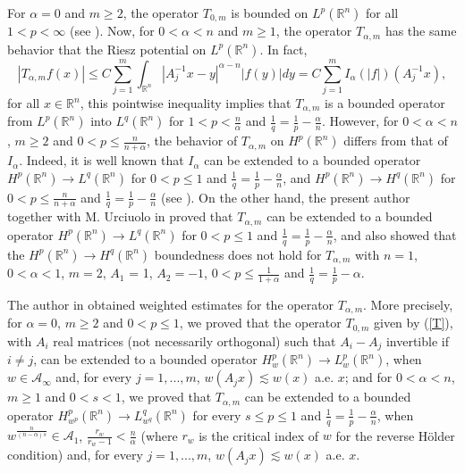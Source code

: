 \documentclass[oneside,10pt]{article}
\begin{document}
For $\alpha = 0$ and $m \geq 2$, the operator $T_{0,m}$ is bounded on $L^p(\mathbb{R}^n)$ for all $1 < p < \infty$ 
(see \cite[Theorem 6]{Ro-Ur2017}). Now, for $0 < \alpha < n$ and $m \geq 1$, the operator $T_{\alpha, m}$ has the same behavior that the 
Riesz potential on $L^{p}(\mathbb{R}^{n})$. In fact,
\[
|T_{\alpha, m}f(x) | \leq C \sum_{j=1}^{m} \int_{\mathbb{R}^{n}} |A_{j}^{-1}x - y |^{\alpha - n} |f(y)| dy = C \sum_{j=1}^{m} I_{\alpha}(|f|)(A_{j}^{-1}x),
\]
for all $x \in \mathbb{R}^{n}$, this pointwise inequality implies that $T_{\alpha, m}$ is a bounded operator from 
$L^{p}(\mathbb{R}^{n})$ into $L^{q}(\mathbb{R}^{n})$ for $1 < p < \frac{n}{\alpha}$ and $\frac{1}{q} = \frac{1}{p} - \frac{\alpha}{n}$. However, for $0 < \alpha < n$, $m \geq 2$ and $0 < p \leq \frac{n}{n + \alpha}$, the behavior of $T_{\alpha, m}$ on $H^p(\mathbb{R}^n)$ 
differs from that of $I_{\alpha}$. Indeed, it is well known that $I_{\alpha}$ can be extended to 
a bounded operator $H^p(\mathbb{R}^n) \to L^{q}(\mathbb{R}^{n})$ for $0 < p \leq 1$ and $\frac{1}{q} = \frac{1}{p} - \frac{\alpha}{n}$, 
and $H^p(\mathbb{R}^n) \to H^{q}(\mathbb{R}^{n})$ for $0 < p \leq \frac{n}{n+\alpha}$ and $\frac{1}{q} = \frac{1}{p} - \frac{\alpha}{n}$ 
(see \cite{Taible}). On the other hand, the present author together with M. Urciuolo in \cite{Ro-Ur2012} proved that $T_{\alpha, m}$ can be extended to a bounded operator $H^p(\mathbb{R}^n) \to L^{q}(\mathbb{R}^{n})$ for $0 < p \leq 1$ and $\frac{1}{q} = \frac{1}{p} - \frac{\alpha}{n}$, and also showed that the $H^p(\mathbb{R}^n) \to H^{q}(\mathbb{R}^{n})$ boundedness does not 
hold for $T_{\alpha, m}$ with $n=1$, $0 < \alpha < 1$, $m = 2$, $A_1$ = 1, $A_2 = -1$, $0 < p \leq \frac{1}{1+\alpha}$ and 
$\frac{1}{q} = \frac{1}{p} - \alpha$.

The author in \cite{Rocha2023} obtained weighted estimates for the operator $T_{\alpha, m}$. More precisely, for $\alpha = 0$, $m \geq 2$ 
and $0 < p \leq 1$, we proved that the operator $T_{0,m}$ given by (\ref{T}), with $A_i$ real matrices (not necessarily orthogonal) such that 
$A_i - A_j$ invertible if $i \neq j$, can be extended to a bounded operator $H^p_{w}(\mathbb{R}^n) \to L^p_{w}(\mathbb{R}^n)$, when 
$w \in \mathcal{A}_{\infty}$ and, for every $j= 1, ..., m$, $w(A_j x) \lesssim w(x)$ a.e. $x$; and for $0 < \alpha < n$, $m \geq 1$ and 
$0 < s <1$, we proved that $T_{\alpha, m}$ can be extended to a bounded operator $H^p_{w^p}(\mathbb{R}^n) \to L^q_{w^q}(\mathbb{R}^n)$ for every $s \leq p \leq 1$ and $\frac{1}{q} = \frac{1}{p} - \frac{\alpha}{n}$, when $w^{\frac{n}{(n - \alpha)s}} \in \mathcal{A}_1$, 
$\frac{r_w}{r_w - 1} < \frac{n}{\alpha}$ (where $r_w$ is the critical index of $w$ for the reverse H\"older condition) and, 
for every $j= 1, ..., m$, $w(A_j x) \lesssim w(x)$ a.e. $x$.
\end{document}
